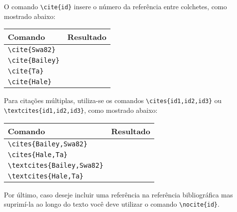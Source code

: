 O comando \lstinline+\cite{id}+ insere o número da referência entre colchetes,
como mostrado abaixo:
\begin{center}
  \centering
  \begin{tabular}{|l|c|}
    \hline
    Comando & Resultado \\ \hline
    \lstinline+\cite{Swa82}+ & \cite{Swa82} \\ \hline
    \lstinline+\cite{Bailey}+ & \cite{Bailey} \\ \hline
    \lstinline+\cite{Ta}+ & \cite{Ta} \\ \hline
    \lstinline+\cite{Hale}+ & \cite{Hale} \\ \hline
  \end{tabular}
\end{center}

Para citações múltiplas, utiliza-se os comandos \lstinline+\cites{id1,id2,id3}+
ou \lstinline+\textcites{id1,id2,id3}+, como mostrado abaixo:
\begin{center}
  \centering
  \begin{tabular}{|l|c|}
    \hline
    Comando & Resultado \\ \hline
    \lstinline+\cites{Bailey,Swa82}+ & \cites{Bailey,Swa82} \\ \hline
    \lstinline+\cites{Hale,Ta}+ & \cites{Hale,Ta} \\ \hline
    \lstinline+\textcites{Bailey,Swa82}+ & \textcites{Bailey,Swa82} \\ \hline
    \lstinline+\textcites{Hale,Ta}+ & \textcites{Hale,Ta} \\ \hline
  \end{tabular}
\end{center}

Por último, caso deseje incluir uma referência na referência bibliográfica mas
suprimí-la ao longo do texto você deve utilizar o comando
\lstinline+\nocite{id}+.
